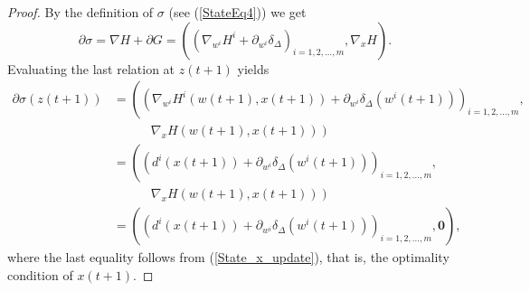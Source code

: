 \begin{proof}
By the definition of $\sigma$ (see (\ref{StateEq4})) we get
\begin{equation*}
	\partial \sigma = \nabla H + \partial G  
= \left( \left( \nabla_{w^i} H^i + \partial_{w^i} \delta_{\Delta} \right)_{i=1,2, \ldots ,m} , \nabla_x H \right) .
\end{equation*}
Evaluating the last relation at $z(t+1)$ yields
\begin{align}
	\partial \sigma(z(t + 1)) &= \left( \left( \nabla_{w^i} H^i(w(t+1),x(t+1)) + \partial_{w^i} \delta_{\Delta}(w^i(t+1)) \right)_{i=1,2, \ldots ,m} , \right. \nonumber \\
	&\quad\quad\quad \left. \nabla_x H(w(t+1),x(t+1)) \right) \nonumber \\
	& = \left( \left( d^i(x(t+1)) + \partial_{w^i} \delta_{\Delta}(w^i(t+1)) \right)_{i=1,2, \ldots ,m} , \right. \nonumber \\
	&\quad\quad\quad \left. \nabla_x H(w(t+1),x(t+1)) \right) \nonumber \\
	& = \left( \left( d^i(x(t+1)) + \partial_{w^i} \delta_{\Delta}(w^i(t+1)) \right)_{i=1,2, \ldots ,m} , \mathbf{0} \right) , \label{StateEq9}
\end{align}
where the last equality follows from (\ref{State_x_update}), that is, the optimality condition of $x(t+1)$.


\end{proof}
